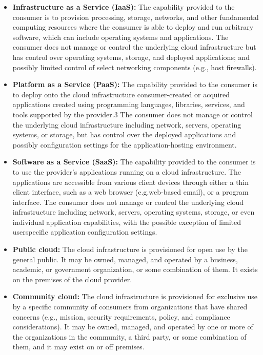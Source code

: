 \documentclass[a4,12pt]{scrartcl}
\begin{document}
\begin{itemize}
\item \textbf{Infrastructure as a Service (IaaS):} The capability provided to the consumer is to provision processing, storage, networks, and other fundamental computing resources where the consumer is able to deploy and run arbitrary software, which can include operating systems and applications. The consumer does not manage or control the underlying cloud infrastructure but has control over operating systems, storage, and deployed applications; and possibly limited control of select networking components (e.g., host firewalls).

\item \textbf{Platform as a Service (PaaS):} The capability provided to the consumer is to deploy onto the cloud infrastructure consumer-created or acquired applications created using programming languages, libraries, services, and tools supported by the provider.3 The consumer does not manage or control the underlying cloud infrastructure including network, servers, operating systems, or storage, but has control over the deployed applications and possibly configuration settings for the application-hosting environment.

\item \textbf{Software as a Service (SaaS):} The capability provided to the consumer is to use the provider’s applications running on a cloud infrastructure. The applications are accessible from various client devices through either a thin client interface, such as a web browser (e.g.web-based email), or a program interface. The consumer does not manage or control the underlying cloud infrastructure including network, servers, operating systems, storage, or even individual application capabilities, with the possible exception of limited userspecific application configuration settings.

\item \textbf{Public cloud:} The cloud infrastructure is provisioned for open use by the general public. It may be owned, managed, and operated by a business, academic, or government organization, or some combination of them. It exists on the premises of the cloud provider.

\item \textbf{Community cloud:} The cloud infrastructure is provisioned for exclusive use by a specific community of consumers from organizations that have shared concerns (e.g., mission, security requirements, policy, and compliance considerations). It may be owned, managed, and operated by one or more of the organizations in the community, a third party, or some combination of them, and it may exist on or off premises.


\end{itemize}
\end{document}

